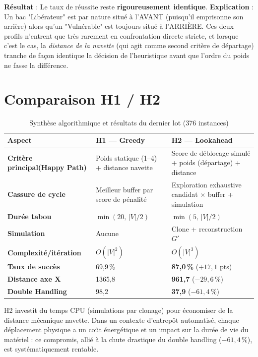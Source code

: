 \documentclass[12pt,a4paper]{article}
\begin{document}
\textbf{Résultat} : Le taux de réussite reste \textbf{rigoureusement identique}.
\textbf{Explication} : Un bac "Libérateur" est par nature situé à l'AVANT (puisqu'il emprisonne son arrière) alors qu'un "Vulnérable" est toujours situé à l'ARRIÈRE. Ces deux profils n'entrent que très rarement en confrontation directe stricte, et lorsque c'est le cas, la \emph{distance de la navette} (qui agit comme second critère de départage) tranche de façon identique la décision de l'heuristique avant que l'ordre du poids ne fasse la différence.

\section{Comparaison H1 / H2}

\begin{table}[H]
\centering
\renewcommand{\arraystretch}{1.4}
\begin{tabular}{>{\bfseries}p{3.8cm} p{4.8cm} p{4.8cm}}
\toprule
Aspect & H1 — Greedy & H2 — Lookahead \\
\midrule
Critère principal\newline (Happy Path) &
  Poids statique (1–4) \newline + distance navette &
  Score de déblocage simulé \newline + poids (départage) + distance \\
Cassure de cycle &
  Meilleur buffer par score \newline de pénalité &
  Exploration exhaustive \newline candidat $\times$ buffer + simulation \\
Durée tabou &
  $\min(20,\, |V|/2)$ &
  $\min(5,\, |V|/2)$ \\
Simulation &
  Aucune &
  Clone + reconstruction $G'$ \\
Complexité/itération &
  $O(|V|^2)$ &
  $O(|V|^3)$ \\
\midrule
Taux de succès & 69,9\,\% & \textbf{87,0\,\%} ($+17,1$ pts) \\
Distance axe X & 1365,8 & \textbf{961,7} ($-29,6$\,\%) \\
Double Handling & 98,2 & \textbf{37,9} ($-61,4$\,\%) \\
\bottomrule
\end{tabular}
\caption{Synthèse algorithmique et résultats du dernier lot (376 instances)}
\end{table}

H2 investit du temps CPU (simulations par clonage) pour économiser
de la distance mécanique navette. Dans un contexte d'entrepôt
automatisé, chaque déplacement physique a un coût énergétique et
un impact sur la durée de vie du matériel : ce compromis, allié à la
chute drastique du double handling ($-61,4$\,\%), est systématiquement rentable.
\end{document}
